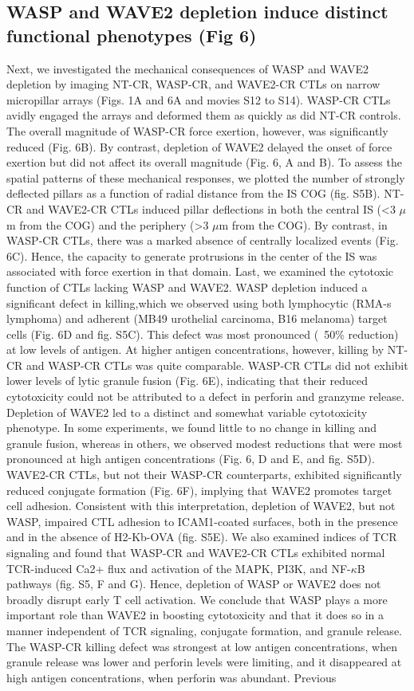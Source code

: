 \subsection{WASP and WAVE2 depletion induce distinct functional phenotypes (Fig 6)}
Next, we investigated the mechanical consequences of WASP and WAVE2 depletion by imaging NT-CR, WASP-CR, and WAVE2-CR CTLs on narrow micropillar arrays (Figs. 1A and 6A and movies S12 to S14). WASP-CR CTLs avidly engaged the arrays and deformed them as quickly as did NT-CR controls. The overall magnitude of WASP-CR force exertion, however, was significantly reduced (Fig. 6B). By contrast, depletion of WAVE2 delayed the onset of force exertion but did not affect its overall magnitude (Fig. 6, A and B). To assess the spatial patterns of these mechanical responses, we plotted the number of strongly deflected pillars as a function of radial distance from the IS COG (fig. S5B). NT-CR and WAVE2-CR CTLs induced pillar deflections in both the central IS (<3 $\mu$m from the COG) and the periphery (>3 $\mu$m from the COG). By contrast, in WASP-CR CTLs, there was a marked absence of centrally localized events (Fig. 6C). Hence, the capacity to generate protrusions in the center of the IS was associated with force exertion in that domain. Last, we examined the cytotoxic function of CTLs lacking WASP and WAVE2. WASP depletion induced a significant defect in killing,which we observed using both lymphocytic (RMA-s lymphoma) and adherent (MB49 urothelial carcinoma, B16 melanoma) target cells (Fig. 6D and fig. S5C). This defect was most pronounced (~50\% reduction) at low levels of antigen. At higher antigen concentrations, however, killing by NT-CR and WASP-CR CTLs was quite comparable. WASP-CR CTLs did not exhibit lower levels of lytic granule fusion (Fig. 6E), indicating that their reduced cytotoxicity could not be attributed to a defect in perforin and granzyme release. Depletion of WAVE2 led to a distinct and somewhat variable cytotoxicity phenotype. In some experiments, we found little to no change in killing and granule fusion, whereas in others, we observed modest reductions that were most pronounced at high antigen concentrations (Fig. 6, D and E, and fig. S5D). WAVE2-CR CTLs, but not their WASP-CR counterparts, exhibited significantly reduced conjugate formation (Fig. 6F), implying that WAVE2 promotes target cell adhesion. Consistent with this interpretation, depletion of WAVE2, but not WASP, impaired CTL adhesion to ICAM1-coated surfaces, both in the presence and in the absence of H2-Kb-OVA (fig. S5E). We also examined indices of TCR signaling and found that WASP-CR and WAVE2-CR CTLs exhibited normal TCR-induced Ca2+ flux and activation of the MAPK, PI3K, and NF-$\kappa$B pathways (fig. S5, F and G). Hence, depletion of WASP or WAVE2 does not broadly disrupt early T cell activation. We conclude that WASP plays a more important role than WAVE2 in boosting cytotoxicity and that it does so in a manner independent of TCR signaling, conjugate formation, and granule release. The WASP-CR killing defect was strongest at low antigen concentrations, when granule release was lower and perforin levels were limiting, and it disappeared at high antigen concentrations, when perforin was abundant. Previous 